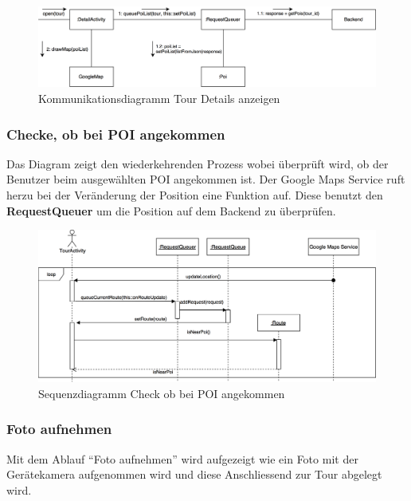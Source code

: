 \documentclass[a4paper,10pt,xetex]{article}
\begin{document}
\begin{figure}
  \includegraphics{Kommunikationsdiagramm_DetailActivity}
  \caption{Kommunikationsdiagramm Tour Details anzeigen}
\end{figure}

\newpage
\subsubsection{Checke, ob bei POI angekommen}
Das Diagram zeigt den wiederkehrenden Prozess wobei überprüft wird, ob der Benutzer beim
ausgewählten POI angekommen ist. Der Google Maps Service ruft herzu bei der Veränderung
der Position eine Funktion auf. Diese benutzt den \textbf{RequestQueuer} um die Position
auf dem Backend zu überprüfen.

\begin{figure}
  \includegraphics{Sequenzdiagramm_IsNearPoi}
  \caption{Sequenzdiagramm Check ob bei POI angekommen}
\end{figure}

\newpage
\subsubsection{Foto aufnehmen}
Mit dem Ablauf ``Foto aufnehmen'' wird aufgezeigt wie ein Foto mit der Gerätekamera
aufgenommen wird und diese Anschliessend zur Tour abgelegt wird.
\end{document}
